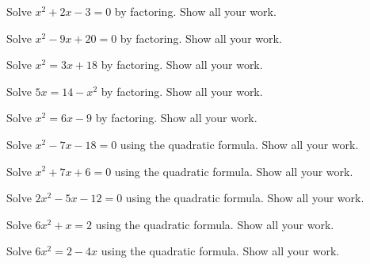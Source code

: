 \documentclass[11pt,letterpaper]{article}
\begin{document}

 Solve $x^2 + 2x - 3= 0$ by factoring. Show all your work. 





\newpage





 Solve $x^2 - 9x + 20= 0$ by factoring. Show all your work. 





\newpage





 Solve $x^2= 3x + 18$ by factoring. Show all your work. 





\newpage





 Solve $5x= 14 - x^2$ by factoring. Show all your work. 





\newpage





 Solve $x^2= 6x - 9$ by factoring. Show all your work. 





\newpage





 Solve $x^2 - 7x - 18= 0$ using the quadratic formula. Show all your work. 





\newpage





 Solve $x^2 + 7x + 6= 0$ using the quadratic formula. Show all your work. 





\newpage





 Solve $2x^2 - 5x - 12= 0$ using the quadratic formula. Show all your work. 





\newpage





 Solve $6x^2 + x= 2$ using the quadratic formula. Show all your work. 





\newpage





 Solve $6x^2= 2 - 4x$ using the quadratic formula. Show all your work. 





\end{document}
